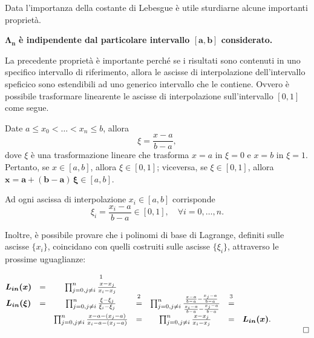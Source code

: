 \addtocounter{footnote}{-1}


Data l'importanza della costante di Lebesgue è utile sturdiarne alcune importanti proprietà.

\begin{property}[di $\Lambda_n$]
	$\boldsymbol{\Lambda_n}$ \textbf{è indipendente dal particolare intervallo $\boldsymbol{[a,b]}$ considerato.}
\end{property}

La precedente proprietà è importante perché se i risultati sono contenuti in uno specifico intervallo di riferimento, allora le ascisse di interpolazione dell'intervallo speficico sono estendibili ad uno generico intervallo che le contiene. Ovvero è possibile trasformare linearente le ascisse di interpolazione sull'intervallo $[0,1]$ come segue.

Date $a\leq x_0<\hdots<x_n \leq b$, allora
\begin{equation}\label{eq:xi}
    \xi=\frac{x-a}{b-a}, 
\end{equation}
dove $\xi$ è una trasformazione lineare che trasforma $x=a$ in $\xi = 0$ e  $x=b$ in $\xi = 1$. Pertanto, se $x\in [a,b]$, allora $\xi\in [0,1]$; viceversa, se $\xi\in [0,1]$, allora $\boldsymbol{x=a+(b-a)\,\xi}\in [a,b]$.

Ad ogni ascissa di interpolazione $x_i\in [a,b]$ corrisponde
\begin{equation}\label{eq:xi_i}
    \xi_i=\frac{x_i-a}{b-a}\in [0,1],\quad \forall i=0,\hdots,n.
\end{equation}

Inoltre, è possibile provare che i polinomi di base di Lagrange, definiti sulle ascisse $\{x_i\}$, coincidano con quelli costruiti sulle ascisse $\{\xi_i\}$, attraverso le prossime uguaglianze:

\begin{equation*}
    \begin{matrix}
        \boldsymbol{L_{in}(x)} &=&\prod_{j=0, j\neq i}^n\frac{\overset{\footnotemark}{x}-x_j}{x_i-x_j}&&&&&&\\
        \boldsymbol{L_{in}(\xi)} &=& \prod_{j=0,j\neq i}^n\frac{\xi-\xi_j}{\xi_i-\xi_j}&\overset{\footnotemark}{=}&\prod_{j=0, j\neq i}^n\frac{\frac{x-a}{b-a}-\frac{x_j-a}{b-a}}{\frac{x_i-a}{b-a}-\frac{x_j-a}{b-a}}&\overset{\footnotemark}{=}&\\
        &&\prod_{j=0,j\neq i}^n\frac{x-a-(x_j-a)}{x_i-a-(x_j-a)}&=&\prod_{j=0,j\neq i}^n\frac{x-x_j}{x_i-x_j}&=&\boldsymbol{L_{in}(x)}.\\
        &&&&&&&&\qed
    \end{matrix}
\end{equation*}

